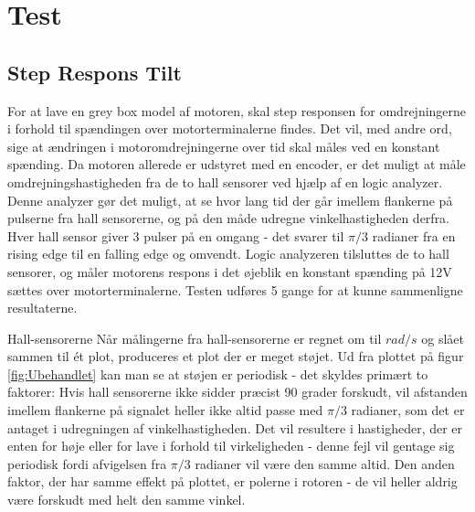 \section{Test}

\subsection{Step Respons Tilt}

For at lave en grey box model af motoren, skal step responsen for omdrejningerne i forhold til spændingen over motorterminalerne findes. Det vil, med andre ord, sige at ændringen i motoromdrejningerne over tid skal måles ved en konstant spænding. Da motoren allerede er udstyret med en encoder, er det muligt at måle omdrejningshastigheden fra de to hall sensorer ved hjælp af en logic analyzer. Denne analyzer gør det muligt, at se hvor lang tid der går imellem flankerne på pulserne fra hall sensorerne, og på den måde udregne vinkelhastigheden derfra. 
Hver hall sensor giver 3 pulser på en omgang - det svarer til $\pi/3$ radianer fra en rising edge til en falling edge og omvendt. Logic analyzeren tilsluttes de to hall sensorer, og måler motorens respons i det øjeblik en konstant spænding på 12V sættes over motorterminalerne. Testen udføres 5 gange for at kunne sammenligne resultaterne. 

Hall-sensorerne Når målingerne fra hall-sensorerne er regnet om til $rad/s$ og slået sammen til ét plot, produceres et plot der er meget støjet. Ud fra plottet på figur \ref{fig:Ubehandlet} kan man se at støjen er periodisk - det skyldes primært to faktorer: Hvis hall sensorerne ikke sidder præcist 90 grader forskudt, vil afstanden imellem flankerne på signalet heller ikke altid passe med $\pi/3$ radianer, som det er antaget i udregningen af vinkelhastigheden. Det vil resultere i hastigheder, der er enten for høje eller for lave i forhold til virkeligheden - denne fejl vil gentage sig periodisk fordi afvigelsen fra $\pi/3$ radianer vil være den samme altid. Den anden faktor, der har samme effekt på plottet, er polerne i rotoren - de vil heller aldrig være forskudt med helt den samme vinkel.

